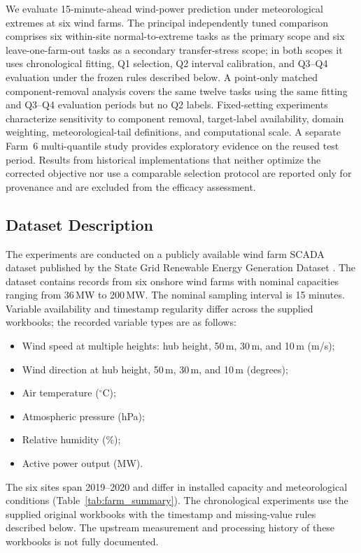 \documentclass[a4paper]{cas-sc}
\begin{document}
{\color{blue}We evaluate 15-minute-ahead wind-power prediction under meteorological extremes at six wind farms. The principal independently tuned comparison comprises six within-site normal-to-extreme tasks as the primary scope and six leave-one-farm-out tasks as a secondary transfer-stress scope; in both scopes it uses chronological fitting, Q1 selection, Q2 interval calibration, and Q3--Q4 evaluation under the frozen rules described below. A point-only matched component-removal analysis covers the same twelve tasks using the same fitting and Q3--Q4 evaluation periods but no Q2 labels. Fixed-setting experiments characterize sensitivity to component removal, target-label availability, domain weighting, meteorological-tail definitions, and computational scale. A separate Farm~6 multi-quantile study provides exploratory evidence on the reused test period. Results from historical implementations that neither optimize the corrected objective nor use a comparable selection protocol are reported only for provenance and are excluded from the efficacy assessment.}

\subsection{Dataset Description}\label{sec:data}

The experiments are conducted on a publicly available wind farm SCADA dataset published by the State Grid Renewable Energy Generation Dataset \citep{s41597-022-01696-6}. The dataset contains records from six onshore wind farms with nominal capacities ranging from 36\,MW to 200\,MW. {\color{blue}The nominal sampling interval is 15 minutes. Variable availability and timestamp regularity differ across the supplied workbooks; the recorded variable types are as follows:}

\begin{itemize}
    \item Wind speed at multiple heights: hub height, 50\,m, 30\,m, and 10\,m (m/s);
    \item {\color{blue}Wind direction at hub height, 50\,m, 30\,m, and 10\,m (degrees);}
    \item Air temperature ($^\circ$C);
    \item Atmospheric pressure (hPa);
    \item Relative humidity (\%);
    \item Active power output (MW).
\end{itemize}

{\color{blue}The six sites span 2019--2020 and differ in installed capacity and meteorological conditions (Table~\ref{tab:farm_summary}). The chronological experiments use the supplied original workbooks with the timestamp and missing-value rules described below. The upstream measurement and processing history of these workbooks is not fully documented.}
\end{document}
